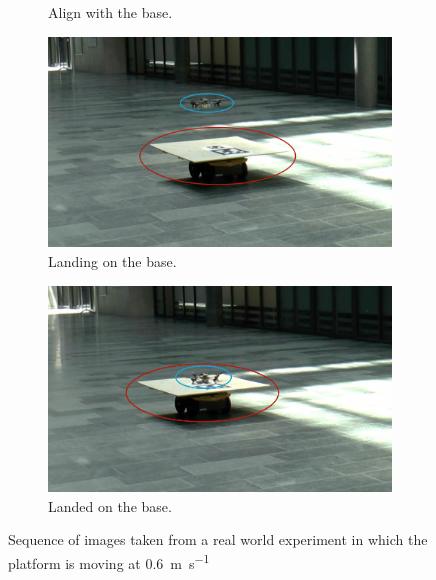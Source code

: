 \begin{figure}[!htbp]
\begin{subfigure}[b]{0.5\textwidth}
        \caption{Align with the base.}
        \label{fig:three}
   \end{subfigure}
    \begin{subfigure}[b]{0.5\textwidth}
        \includegraphics[width=\textwidth]{img/landing1.png}
        \caption{Landing on the base.}
        \label{fig:four}
   \end{subfigure} 
    \begin{subfigure}[b]{0.5\textwidth}
        \includegraphics[width=\textwidth]{img/landed1.png}
        \caption{Landed on the base.}
        \label{fig:five}
   \end{subfigure}
   
  \caption{Sequence of images taken from a real world experiment in which the platform is moving at \SI{0.6}{\meter \per \second} }
  \label{fig:landing1}
\end{figure} 

